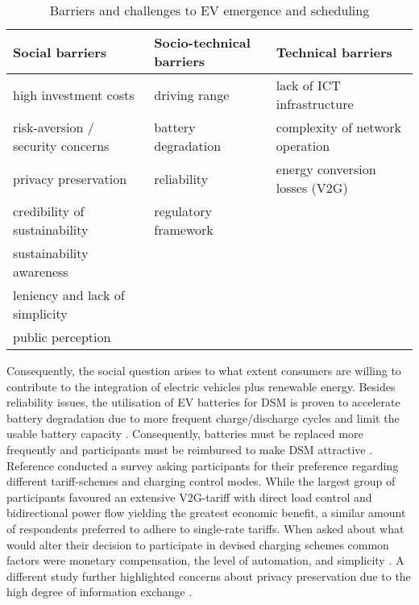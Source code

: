 \begin{table}[]
	\centering
	\resizebox{\textwidth}{!} {%
		\begin{tabular}{@{}lll@{}}
			\toprule
			\textbf{Social barriers}                     & \textbf{Socio-technical barriers} & \textbf{Technical barriers}              \\ \midrule
			\tabitem high investment costs               & \tabitem driving range            & \tabitem lack of ICT infrastructure      \\
			\tabitem risk-aversion / security concerns & \tabitem battery degradation      & \tabitem complexity of network operation \\
			\tabitem privacy preservation                & \tabitem reliability              & \tabitem energy conversion losses (V2G)  \\
			\tabitem credibility of sustainability       & \tabitem regulatory framework     &                                          \\
			\tabitem sustainability awareness            &                                   &                                          \\
			\tabitem leniency and lack of simplicity     &                                   &                                          \\
			\tabitem public perception                   &                                   &                                          \\ \bottomrule
		\end{tabular}
	}
	\caption{Barriers and challenges to EV emergence and scheduling}
	\label{tab:barriers}
\end{table}

Consequently, the social question arises to what extent consumers are willing to contribute to the integration of electric vehicles plus renewable energy. Besides reliability issues, the utilisation of EV batteries for DSM is proven to accelerate battery degradation due to more frequent charge/discharge cycles and limit the usable battery capacity \cite{Peterson2010, Wang2013a}. Consequently, batteries must be replaced more frequently and participants must be reimbursed to make DSM attractive \cite{Dehaghani2012}. Reference \cite{Dutschke2013} conducted a survey asking participants for their preference regarding different tariff-schemes and charging control modes. While the largest group of participants favoured an extensive V2G-tariff with direct load control and bidirectional power flow yielding the greatest economic benefit, a similar amount of respondents preferred to adhere to single-rate tariffs. When asked about what would alter their decision to participate in devised charging schemes common factors were monetary compensation, the level of automation, and simplicity \cite{Dutschke2013}. A different study further highlighted concerns about privacy preservation due to the high degree of information exchange \cite{Sovacool2009}.

